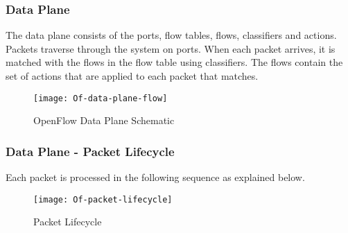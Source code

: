 \subsubsection{Data Plane \cite{Opnflow_switch}} \label{of_data_plane}

The data plane consists of the ports, flow tables, flows, classifiers and actions. Packets traverse through the system on ports. When each packet arrives, it is matched with the flows in the flow table using classifiers. The flows contain the set of actions that are applied to each packet that matches.

\begin{figure}[H]
	\centering
	\texttt{[image: Of-data-plane-flow]}
	\caption{OpenFlow Data Plane Schematic \cite{Of_data_plane_flow_img}} \label{fig:Of_data_plane_img}
	\vspace{-10pt}
\end{figure}

\subsubsection{Data Plane - Packet Lifecycle \cite{Opnflow_switch}} \label{of_data_plane_lifecycle}

Each packet is processed in the following sequence as explained below.
\begin{figure}[H]
	\centering
	\texttt{[image: Of-packet-lifecycle]}
	\caption {Packet Lifecycle \cite{Of_packet_lifecycle}}
	\label{fig:of_packet_lifecycle}
	\vspace{-10pt}
\end{figure}

